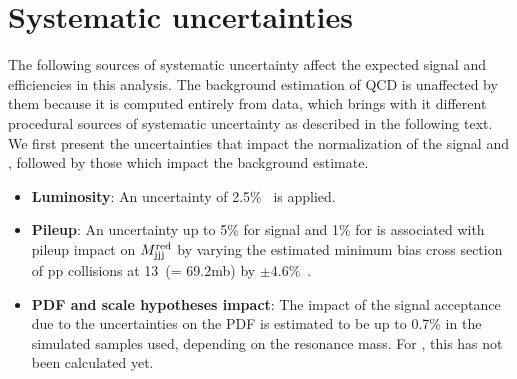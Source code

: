 \section{Systematic uncertainties\label{sec:Systematics}}

The following sources of systematic uncertainty affect the expected signal and \ttbar efficiencies in this analysis. The background estimation of QCD is unaffected by them because it is computed entirely from data, which brings with it different procedural sources of systematic uncertainty as described in the following text. We first present the uncertainties that impact the normalization of the signal and \ttbar, followed by those which impact the background estimate.

\begin{itemize}

\item \textbf{Luminosity}: An uncertainty of 2.5\%~\cite{CMS-PAS-LUM-17-001} is applied.

\item \textbf{Pileup}: An uncertainty up to 5\% for signal and 1\% for \ttbar is associated with pileup impact on $M_{\rm jjj}^{\rm red}$ by varying the estimated minimum bias cross section of pp collisions at 13~\TeV (= 69.2\unit{mb}) by $\pm 4.6\%$~\cite{PileupTWiki}.

\item \textbf{PDF and scale hypotheses impact}: The impact of the signal acceptance due to the uncertainties on the PDF is estimated to be up to 0.7\% in the simulated samples used, depending on the resonance mass. For \ttbar, this has not been calculated yet.


\end{itemize}
